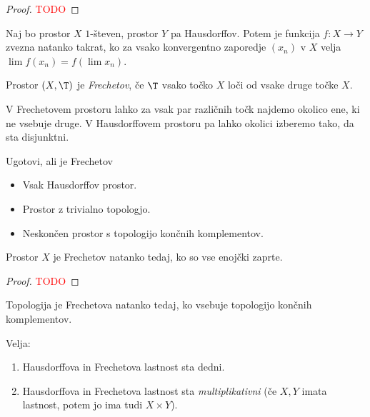 \begin{proof}
    \textcolor{red}{TODO}
\end{proof}

\begin{izrek}
    Naj bo prostor $X$ $1$-števen, prostor $Y$ pa Hausdorffov. Potem je funkcija $f: X \to Y$ zvezna natanko takrat, ko za vsako konvergentno zaporedje $(x_n)$ v $X$ velja $\lim f(x_n) = f(\lim x_n)$.
\end{izrek}

\begin{definicija}
    Prostor $(X, \T)$ je \emph{Frechetov}, če $\T$ vsako točko $X$ loči od vsake druge točke $X$.
\end{definicija}

\begin{opomba}
    V Frechetovem prostoru lahko za vsak par različnih točk najdemo okolico ene, ki ne vsebuje druge. V Hausdorffovem prostoru pa lahko okolici izberemo tako, da sta disjunktni.
\end{opomba}

\begin{primer}
   Ugotovi, ali je Frechetov
    \begin{itemize}
        \item Vsak Hausdorffov prostor.
        \item Prostor z trivialno topologjo.
        \item Neskončen prostor s topologijo končnih komplementov.
    \end{itemize}
\end{primer}

\begin{trditev}
    Prostor $X$ je Frechetov natanko tedaj, ko so vse enojčki zaprte.
\end{trditev}

\begin{proof}
    \textcolor{red}{TODO}
\end{proof}

\begin{opomba}
    Topologija je Frechetova natanko tedaj, ko vsebuje topologijo končnih komplementov.
\end{opomba}

\begin{trditev}
    Velja:
    \begin{enumerate}
        \item Hausdorffova in Frechetova lastnost sta dedni.
        \item Hausdorffova in Frechetova lastnost sta \emph{multiplikativni} (če $X, Y$ imata lastnost, potem jo ima tudi $X \times Y$).
    \end{enumerate}
\end{trditev}

